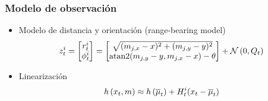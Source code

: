 \begin{frame}
    \frametitle{Modelo de observación}
    \begin{itemize}
    \item Modelo de distancia y orientación (range-bearing model)
    \begin{equation*}
        z_{t}^{i} =
        \begin{bmatrix}
            r_{t}^{i}\\
            \phi_{t}^{i} 
        \end{bmatrix} =
        \begin{bmatrix}
            \sqrt{(m_{j,x}-x)^{2} + (m_{j,y}-y)^{2}}\\
            \operatorname{atan2}(m_{j,y}-y, m_{j,x}-x) -\theta
        \end{bmatrix}
        + \mathcal{N}\left( {0}, {Q_{t}} \right)        
    \end{equation*}
    
    \item Linearización
    \begin{equation*}
    h\left( x_{t}, m \right) \approx             h\left( \overline{\mu}_{t} \right) + H_{t}^{i}(x_{t}-\overline{\mu}_{t})
    \end{equation*}
    \end{itemize}
    
\end{frame}

